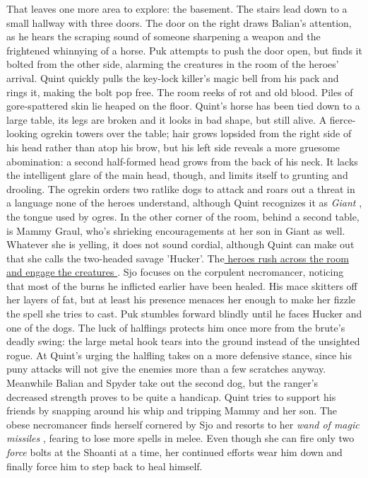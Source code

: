 That leaves one more area to explore: the basement. The stairs lead down to a small hallway with three doors. The door on the right draws Balian's attention, as he hears the scraping sound of someone sharpening a weapon and the frightened whinnying of a horse. Puk attempts to push the door open, but finds it bolted from the other side, alarming the creatures in the room of the heroes' arrival. Quint quickly pulls the key-lock killer's magic bell from his pack and rings it, making the bolt pop free. The room reeks of rot and old blood. Piles of gore-spattered skin lie heaped on the floor. Quint's horse has been tied down to a large table, its legs are broken and it looks in bad shape, but still alive. A fierce-looking ogrekin towers over the table; hair grows lopsided from the right side of his head rather than atop his brow, but his left side reveals a more gruesome abomination: a second half-formed head grows from the back of his neck. It lacks the intelligent glare of the main head, though, and limits itself to grunting and drooling. The ogrekin orders two ratlike dogs to attack and roars out a threat in a language none of the heroes understand, although Quint recognizes it as {\itshape Giant} , the tongue used by ogres. In the other corner of the room, behind a second table, is Mammy Graul, who's shrieking encouragements at her son in Giant as well. Whatever she is yelling, it does not sound cordial, although Quint can make out that she calls the two-headed savage 'Hucker'. The\hyperref[fig:Grand-finale-in-the-Graul-homestead-basement-512310881]{ heroes rush across the room and engage the creatures } . Sjo focuses on the corpulent necromancer, noticing that most of the burns he inflicted earlier have been healed. His mace skitters off her layers of fat, but at least his presence menaces her enough to make her fizzle the spell she tries to cast. Puk stumbles forward blindly until he faces Hucker and one of the dogs. The luck of halflings protects him once more from the brute's deadly swing: the large metal hook tears into the ground instead of the unsighted rogue. At Quint's urging the halfling takes on a more defensive stance, since his puny attacks will not give the enemies more than a few scratches anyway. Meanwhile Balian and Spyder take out the second dog, but the ranger's decreased strength proves to be quite a handicap. Quint tries to support his friends by snapping around his whip and tripping Mammy and her son. The obese necromancer finds herself cornered by Sjo and resorts to her  {\itshape wand of magic missiles} , fearing to lose more spells in melee. Even though she can fire only two  {\itshape force} bolts at the Shoanti at a time, her continued efforts wear him down and finally force him to step back to heal himself. \\

